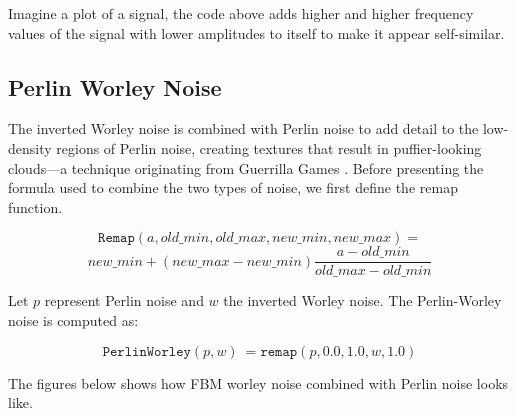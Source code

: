 Imagine a plot of a signal, the code above adds higher and higher frequency values of the signal with lower amplitudes to itself to make it appear self-similar.

\subsection{Perlin Worley Noise}
The inverted Worley noise is combined with Perlin noise to add detail to the low-density regions of Perlin noise, creating textures that result in puffier-looking clouds—a technique originating from Guerrilla Games \cite{guerrillagames2025nubis}. Before presenting the formula used to combine the two types of noise, we first define the remap function.
\begin{definition}
    \[\texttt{Remap}(a, old\_min, old\_max, new\_min, new\_max) =\]
    \[new\_min + 
    (new\_max - new\_min)\frac{a-old\_min}{old\_max - old\_min}\]
\end{definition}

Let \( p \) represent Perlin noise and \( w \) the inverted Worley noise. The Perlin-Worley noise is computed as:
\begin{definition}
    \[
    \texttt{PerlinWorley}(p, w)\ = \texttt{remap}(p, 0.0, 1.0, w, 1.0) 
    \]
\end{definition}

The figures below shows how FBM worley noise combined with Perlin noise looks like.


